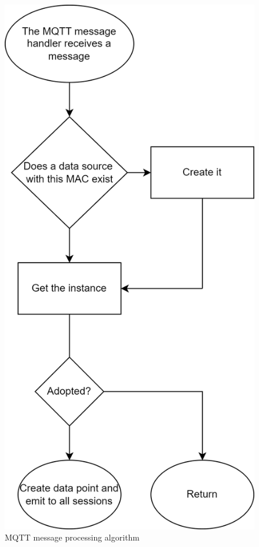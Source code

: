 \documentclass[FM,BP,EN,fonts]{tulthesis}
\begin{document}
\begin{figure}[hp]
    \centering
    \includegraphics[scale=.32]{media/mqtt-processing-flowchart.png}
    \caption{MQTT message processing algorithm}
    \label{fig:mqtt-processing-algorithm}
\end{figure}
\end{document}
